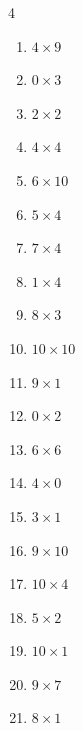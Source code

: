 \begin{multicols}{4}
\begin{enumerate}
  \item $4\times 9$
        \phantom{$=36$}

  \item $0\times 3$
        \phantom{$=0$}

  \item $2\times 2$
        \phantom{$=4$}

  \item $4\times 4$
        \phantom{$=16$}

  \item $6\times 10$
        \phantom{$=60$}

  \item $5\times 4$
        \phantom{$=20$}

  \item $7\times 4$
        \phantom{$=28$}

  \item $1\times 4$
        \phantom{$=4$}

  \item $8\times 3$
        \phantom{$=24$}

  \item $10\times 10$
        \phantom{$=100$}

  \item $9\times 1$
        \phantom{$=9$}

  \item $0\times 2$
        \phantom{$=0$}

  \item $6\times 6$
        \phantom{$=36$}

  \item $4\times 0$
        \phantom{$=0$}

  \item $3\times 1$
        \phantom{$=3$}

  \item $9\times 10$
        \phantom{$=90$}

  \item $10\times 4$
        \phantom{$=40$}

  \item $5\times 2$
        \phantom{$=10$}

  \item $10\times 1$
        \phantom{$=10$}

  \item $9\times 7$
        \phantom{$=63$}

  \item $8\times 1$
        \phantom{$=8$}


\end{enumerate}
\end{multicols}
